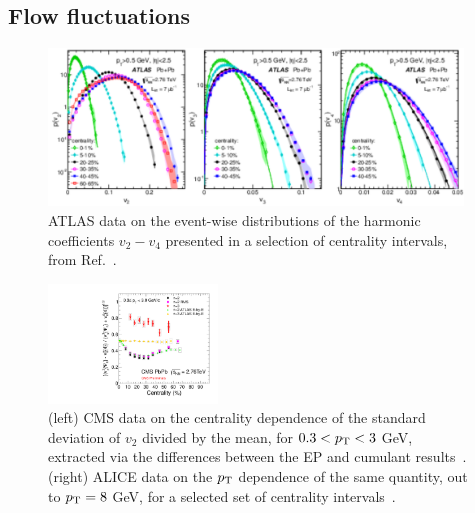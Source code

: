 \subsection{Flow fluctuations}
\begin{figure}[!tb]
\begin{center}
\includegraphics[width=0.98\textwidth]{flowcorrelations_figs/atlas_v2fluc_fig_10.pdf}
\caption[]{
ATLAS data on the event-wise distributions of the harmonic coefficients $v_2 - v_4$ presented in a selection of
centrality intervals, from Ref.~\cite{Aad:2013xma}.
}
\label{fig:pas:fc:flowfluc1}
\end{center}
\end{figure}

\begin{figure}[!tb]
\begin{center}
\includegraphics[width=0.40\textwidth]{flowcorrelations_figs/vnSigmaPrelim.pdf}
\caption[]{
(left) CMS data on the centrality dependence of the standard deviation of $v_2$
divided by the mean, for $0.3 < \mbox{$p_{\mathrm{T}}$} < 3$ GeV,
extracted via the differences between the EP and cumulant results~\cite{Chatrchyan:2013kba}.
(right) ALICE data on the $\mbox{$p_{\mathrm{T}}$}$ dependence of the same quantity, out to $\mbox{$p_{\mathrm{T}}$}=8$ GeV,
for a selected set of centrality
intervals~\cite{Abelev:2012di}.
}
\label{fig:pas:fc:flowfluc2}
\end{center}
\end{figure}

